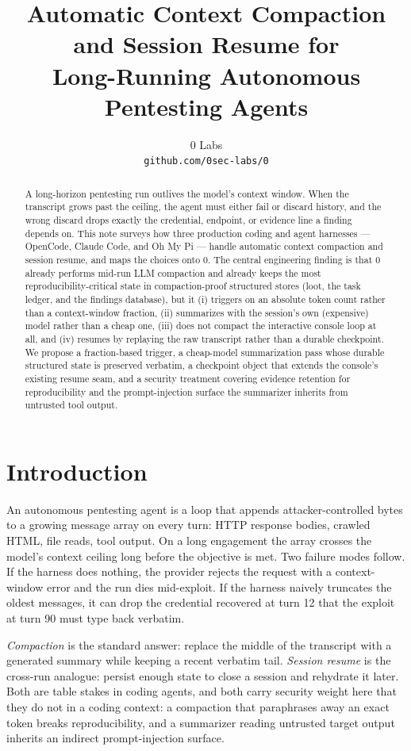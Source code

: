 \documentclass[11pt]{article}
\title{Automatic Context Compaction and Session Resume for\\Long-Running Autonomous Pentesting Agents}
\author{
  0 Labs \\
  \texttt{github.com/0sec-labs/0}
}
\date{}
\begin{document}
\maketitle

\begin{abstract}
A long-horizon pentesting run outlives the model's context window. When the
transcript grows past the ceiling, the agent must either fail or discard
history, and the wrong discard drops exactly the credential, endpoint, or
evidence line a finding depends on. This note surveys how three production
coding and agent harnesses --- OpenCode, Claude Code, and Oh My Pi --- handle
automatic context compaction and session resume, and maps the choices onto 0.
The central engineering finding is that 0 already performs mid-run LLM
compaction and already keeps the most reproducibility-critical state in
compaction-proof structured stores (loot, the task ledger, and the findings
database), but it (i) triggers on an absolute token count rather than a
context-window fraction, (ii) summarizes with the session's own (expensive)
model rather than a cheap one, (iii) does not compact the interactive console
loop at all, and (iv) resumes by replaying the raw transcript rather than a
durable checkpoint. We propose a fraction-based trigger, a cheap-model
summarization pass whose durable structured state is preserved verbatim, a
checkpoint object that extends the console's existing resume seam, and a
security treatment covering evidence retention for reproducibility and the
prompt-injection surface the summarizer inherits from untrusted tool output.
\end{abstract}

\section{Introduction}

An autonomous pentesting agent is a loop that appends attacker-controlled bytes
to a growing message array on every turn: HTTP response bodies, crawled HTML,
file reads, tool output. On a long engagement the array crosses the model's
context ceiling long before the objective is met. Two failure modes follow. If
the harness does nothing, the provider rejects the request with a context-window
error and the run dies mid-exploit. If the harness naively truncates the oldest
messages, it can drop the credential recovered at turn 12 that the exploit at
turn 90 must type back verbatim.

\emph{Compaction} is the standard answer: replace the middle of the transcript
with a generated summary while keeping a recent verbatim tail. \emph{Session
resume} is the cross-run analogue: persist enough state to close a session and
rehydrate it later. Both are table stakes in coding agents, and both carry
security weight here that they do not in a coding context: a compaction that
paraphrases away an exact token breaks reproducibility, and a summarizer reading
untrusted target output inherits an indirect prompt-injection surface.
\end{document}
